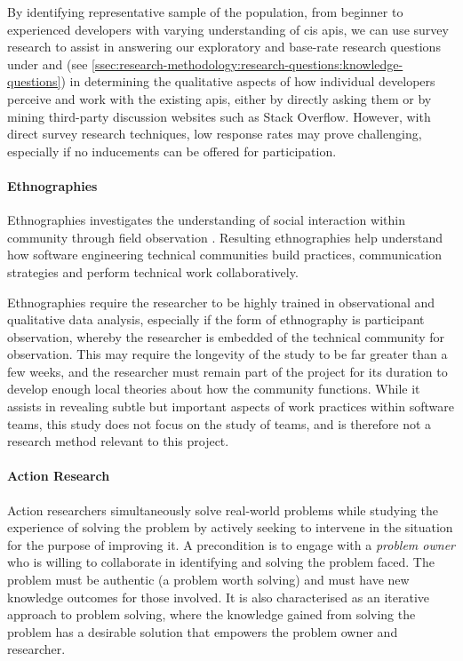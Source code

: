 By identifying representative sample of the population, from beginner to experienced developers with varying understanding of \gls{cis} \glspl{api}, we can use survey research to assist in answering our exploratory and base-rate research questions under  and  (see \cref{ssec:research-methodology:research-questions:knowledge-questions}) in determining the qualitative aspects of how individual developers perceive and work with the existing \glspl{api}, either by directly asking them or by mining third-party discussion websites such as Stack Overflow. However, with direct survey research techniques, low response rates may prove challenging, especially if no inducements can be offered for participation.

\paragraph{Ethnographies}
Ethnographies investigates the understanding of social interaction within community through field observation \citep{Robinson:2007tp}. Resulting ethnographies help understand how software engineering technical communities build practices, communication strategies and perform technical work collaboratively. 

Ethnographies require the researcher to be highly trained in observational and qualitative data analysis, especially if the form of ethnography is participant observation, whereby the researcher is embedded of the technical community for observation. This may require the longevity of the study to be far greater than a few weeks, and the researcher must remain part of the project for its duration to develop enough local theories about how the community functions. While it assists in revealing subtle but important aspects of work practices within software teams, this study does not focus on the study of teams, and is therefore not a research method relevant to this project.


\paragraph{Action Research}
Action researchers simultaneously solve real-world problems while studying the experience of solving the problem \citep{Davison:2004wo} by actively seeking to intervene in the situation for the purpose of improving it. A precondition is to engage with a \textit{problem owner} who is willing to collaborate in identifying and solving the problem faced. The problem must be authentic (a problem worth solving) and must have new knowledge outcomes for those involved. It is also characterised as an iterative approach to problem solving, where the knowledge gained from solving the problem has a desirable solution that empowers the problem owner and researcher. 

